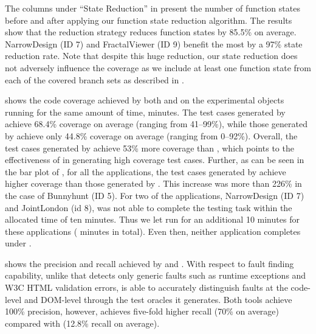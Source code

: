The columns under ``State Reduction'' in  present the number of function states
before and after applying our function state reduction algorithm.   
The results show that the reduction strategy reduces function states by 85.5\% on average. NarrowDesign (ID 7) and FractalViewer (ID 9) benefit the most by a 97\% state reduction rate. 
Note that despite this huge reduction, our state reduction does not adversely influence the coverage as we include at least one function state from each of the covered branch sets as described in .

 shows the code coverage achieved by  both \tool and \artemis on the experimental objects running for the same amount of time,  minutes.
The test cases generated by \tool achieve 68.4\% coverage on average (ranging from 41--99\%), while those generated by \artemis achieve only 44.8\% coverage on average (ranging from 0--92\%).
Overall, the test cases generated by \tool achieve 53\% more coverage than \artemis, which points to the effectiveness of \tool in generating high coverage test cases. 
Further, as can be seen in the bar plot of , for all the applications, the test cases generated by \tool achieve higher coverage than those generated by \artemis. 
This increase was more than 226\% in the case of Bunnyhunt (ID 5). %
For two of the applications, NarrowDesign (ID 7) and JointLondon (id 8), \artemis was not able to complete the testing task within the allocated time of ten minutes.
Thus we let \artemis run for an additional 10 minutes for these applications ( minutes in total). Even then, neither application completes under \artemis. 

 shows the precision and recall achieved by \tool and \artemis.
With respect to fault finding capability, unlike \artemis that detects only generic faults such as runtime exceptions and W3C HTML validation errors, \tool is able to accurately distinguish faults at the code-level and DOM-level through the test oracles it generates. Both tools achieve 100\% precision, however, \tool achieves five-fold higher recall (70\% on average) compared with \artemis (12.8\% recall on average). %
